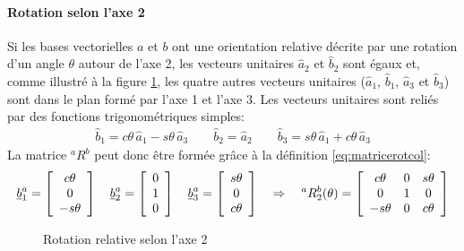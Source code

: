 \paragraph{Rotation selon l'axe 2}
%
Si les bases vectorielles $a$ et $b$ ont une orientation relative décrite par une rotation d'un angle $\theta$ autour de l'axe 2, les vecteurs unitaires $\hat{a}_2$ et $\hat{b}_2$ sont égaux et, comme illustré à la figure \ref{fig:r2vv}, les quatre autres vecteurs unitaires ($\hat{a}_1$, $\hat{b}_1$, $\hat{a}_3$ et $\hat{b}_3$) sont dans le plan formé par l'axe 1 et l'axe 3. Les vecteurs unitaires sont reliés par des fonctions trigonométriques simples:
\begin{align}
	\hat{b}_1 = c\theta \, \hat{a}_1 -s\theta \, \hat{a}_3 \quad\quad
	\hat{b}_2 = \hat{a}_2 \quad\quad
	\hat{b}_3 = s\theta \, \hat{a}_1 + c\theta \, \hat{a}_3
	\label{eq:rot2vecuni}
\end{align}
La matrice $^aR^b$ peut donc être formée grâce à la définition \eqref{eq:matricerotcol}:
\begin{align}
	\underline{b}_1^a = \left[ \begin{array}{c} c\theta \\ 0 \\ -s\theta  \end{array} \right] \quad
	\underline{b}_2^a = \left[ \begin{array}{c} 0 \\ 1 \\ 0  \end{array} \right] \quad
	\underline{b}_3^a = \left[ \begin{array}{c} s\theta \\ 0 \\ c\theta  \end{array} \right]
	\quad \Rightarrow \quad
	^aR^b_2(\theta) = \left[ \begin{array}{c c c}
								 c\theta  & 0 & s\theta \\
								 0        & 1 & 0 \\
								 -s\theta & 0 & c\theta
	\end{array}  \right]
	\label{eq:rot2theta}
\end{align}
%
\begin{figure}[H]
	\centering
	\hspace{+20pt}
	\caption{Rotation relative selon l'axe 2}
	\label{fig:r2vv}
\end{figure}
%


